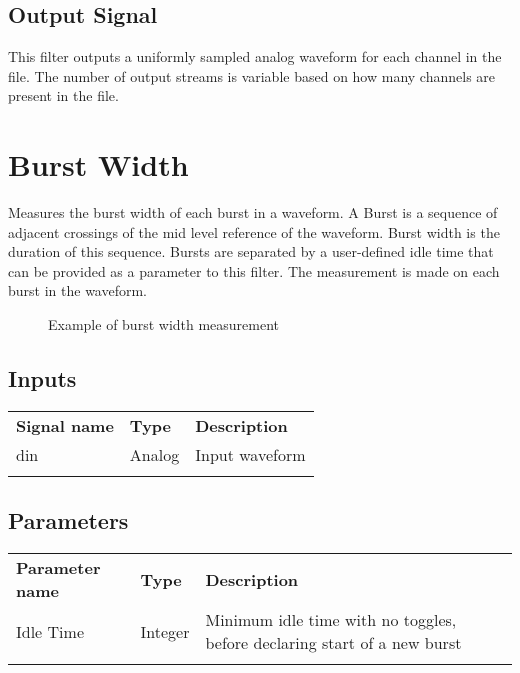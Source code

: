 \subsection{Output Signal}

This filter outputs a uniformly sampled analog waveform for each channel in the file. The number of output streams is
variable based on how many channels are present in the file.

\pagebreak
\section{Burst Width}

Measures the burst width of each burst in a waveform. A Burst is a sequence of adjacent crossings of the mid level reference
of the waveform. Burst width is the duration of this sequence. Bursts are separated by a user-defined idle time that can be
provided as a parameter to this filter. The measurement is made on each burst in the waveform.

\begin{figure}[h]
	\centering
	\caption{Example of burst width measurement}
	\label{filter_burstwidth}
	\end{figure}

\subsection{Inputs}

\begin{tabularx}{16cm}{llX}
\thickhline
\textbf{Signal name} & \textbf{Type} & \textbf{Description} \\
\thickhline
din & Analog & Input waveform \\
\thickhline
\end{tabularx}

\subsection{Parameters}

\begin{tabularx}{16cm}{llX}
\thickhline
\textbf{Parameter name} & \textbf{Type} & \textbf{Description} \\
\thickhline
Idle Time & Integer & Minimum idle time with no toggles, before declaring start of a new burst\\
\thickhline
\end{tabularx}

